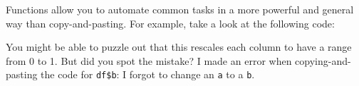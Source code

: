 \documentclass[]{book}
\newenvironment{Shaded}{\begin{snugshade}}{\end{snugshade}}
\newcommand{\KeywordTok}[1]{\textcolor[rgb]{0.13,0.29,0.53}{\textbf{#1}}}
\newcommand{\DataTypeTok}[1]{\textcolor[rgb]{0.13,0.29,0.53}{#1}}
\newcommand{\DecValTok}[1]{\textcolor[rgb]{0.00,0.00,0.81}{#1}}
\newcommand{\StringTok}[1]{\textcolor[rgb]{0.31,0.60,0.02}{#1}}
\newcommand{\OperatorTok}[1]{\textcolor[rgb]{0.81,0.36,0.00}{\textbf{#1}}}
\newcommand{\NormalTok}[1]{#1}
\begin{document}
Functions allow you to automate common tasks in a more powerful and
general way than copy-and-pasting. For example, take a look at the
following code:

\begin{Shaded}
\end{Shaded}

You might be able to puzzle out that this rescales each column to have a
range from 0 to 1. But did you spot the mistake? I made an error when
copying-and-pasting the code for \texttt{df\$b}: I forgot to change an
\texttt{a} to a \texttt{b}.
\end{document}
